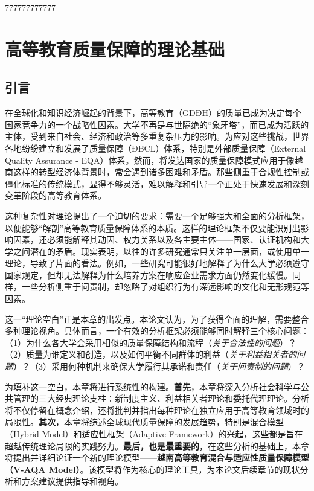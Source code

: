 777777777777

\chapter{高等教育质量保障的理论基础}
\label{chap:ly_luan}

\section*{引言}

在全球化和知识经济崛起的背景下，高等教育（GDĐH）的质量已成为决定每个国家竞争力的一个战略性因素。大学不再是与世隔绝的“象牙塔”，而已成为活跃的主体，受到来自社会、经济和政治等多重复杂压力的影响。为应对这些挑战，世界各地纷纷建立和发展了质量保障（ĐBCL）体系，特别是外部质量保障（External Quality Assurance - EQA）体系。然而，将发达国家的质量保障模式应用于像越南这样的转型经济体背景时，常会遇到诸多困难和矛盾。那些侧重于合规性控制或僵化标准的传统模式，显得不够灵活，难以解释和引导一个正处于快速发展和深刻变革阶段的高等教育体系。

这种复杂性对理论提出了一个迫切的要求：需要一个足够强大和全面的分析框架，以便能够“解剖”高等教育质量保障体系的本质。这样的理论框架不仅要能识别出影响因素，还必须能解释其动因、权力关系以及各主要主体——国家、认证机构和大学之间潜在的矛盾。现实表明，以往的许多研究通常只关注单一层面，或使用单一理论，导致了片面的看法。例如，一些研究可能很好地解释了为什么大学必须遵守国家规定，但却无法解释为什么培养方案在响应企业需求方面仍然变化缓慢。同样，一些分析侧重于问责制，却忽略了对组织行为有深远影响的文化和无形规范等因素。

这一“理论空白”正是本章的出发点。本论文认为，为了获得全面的理解，需要整合多种理论视角。具体而言，一个有效的分析框架必须能够同时解释三个核心问题：（1）为什么各大学会采用相似的质量保障结构和流程（\textit{关于合法性的问题}）？（2）质量为谁定义和创造，以及如何平衡不同群体的利益（\textit{关于利益相关者的问题}）？（3）采用何种机制来确保大学履行其承诺和责任（\textit{关于问责制的问题}）？

为填补这一空白，本章将进行系统性的构建。\textbf{首先}，本章将深入分析社会科学与公共管理的三大经典理论支柱：新制度主义、利益相关者理论和委托代理理论。分析将不仅停留在概念介绍，还将批判并指出每种理论在独立应用于高等教育领域时的局限性。\textbf{其次}，本章将综述全球现代质量保障的发展趋势，特别是混合模型（Hybrid Model）和适应性框架（Adaptive Framework）的兴起，这些都是旨在超越传统理论局限的实践努力。\textbf{最后，也是最重要的}，在这些分析的基础上，本章将提出并详细论证一个新的理论模型——\textbf{越南高等教育混合与适应性质量保障模型（V-AQA Model）}。该模型将作为核心的理论工具，为本论文后续章节的现状分析和方案建议提供指导和视角。


